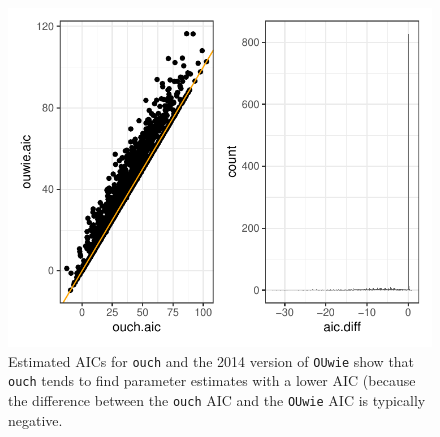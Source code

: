 \documentclass[12pt,reqno,final]{amsart}\usepackage[]{graphicx}\usepackage[]{color}
\makeatletter
\def\maxwidth{ %
  \ifdim\Gin@nat@width>\linewidth
    \linewidth
  \else
    \Gin@nat@width
  \fi
}
\newenvironment{knitrout}{}{} %
\theoremstyle{plain}
\numberwithin{equation}{part}
\makeatother
\begin{document}
\begin{knitrout}
\color{fgcolor}\begin{figure}
\includegraphics[width=\maxwidth]{figure/unnamed-chunk-6-1} \caption[Estimated AICs for \texttt{ouch} and the 2014 version of \texttt{OUwie} show that \texttt{ouch} tends to find parameter estimates with a lower AIC (because the difference between the \texttt{ouch} AIC and the \texttt{OUwie} AIC is typically negative]{Estimated AICs for \texttt{ouch} and the 2014 version of \texttt{OUwie} show that \texttt{ouch} tends to find parameter estimates with a lower AIC (because the difference between the \texttt{ouch} AIC and the \texttt{OUwie} AIC is typically negative.}\label{fig:unnamed-chunk-6}
\end{figure}


\end{knitrout}

\newpage
\end{document}
